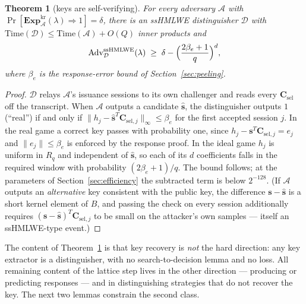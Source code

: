 \documentclass[11pt]{article}
\newcommand{\R}{R_q}
\newcommand{\Adv}{\operatorname{Adv}}
\newcommand{\Exp}{\mathbf{Exp}}
\newtheorem{theorem}{Theorem}[section]
\begin{document}
\begin{theorem}[keys are self-verifying]
\label{thm:selfverify}
For every adversary $\mathcal A$ with
$\Pr[\Exp^{\mathrm{kr}}_{\mathcal A}(\lambda)\Rightarrow 1]=\delta$,
there is an ssHMLWE distinguisher $\mathcal D$ with
$\mathrm{Time}(\mathcal D)\le\mathrm{Time}(\mathcal A)+O(Q)$ inner products
and
\[
 \Adv^{\mathrm{ssHMLWE}}_{\mathcal D}(\lambda)
 \;\ge\;\delta-\Bigl(\frac{2\beta_e+1}{q}\Bigr)^{d},
\]
where $\beta_e$ is the response-error bound of Section~\ref{sec:peeling}.
\end{theorem}

\begin{proof}
$\mathcal D$ relays $\mathcal A$'s issuance sessions to its own
challenger and reads every $\mathbf C_{\mathrm{sel}}$ off the transcript.
When $\mathcal A$ outputs a candidate $\hat{\mathbf s}$, the distinguisher
outputs $1$ (``real'') if and only if
$\|h_j-\hat{\mathbf s}^{T}\mathbf C_{\mathrm{sel},j}\|_\infty\leq\beta_e$
for the first accepted session $j$.  In the real game a correct key passes
with probability one, since
$h_j-\mathbf s^{T}\mathbf C_{\mathrm{sel},j}=e_j$ and
$\|e_j\|\leq\beta_e$ is enforced by the response proof.  In the ideal game
$h_j$ is uniform in $\R$ and independent of $\hat{\mathbf s}$, so each of
its $d$ coefficients falls in the required window with probability
$(2\beta_e+1)/q$.  The bound follows; at the parameters of
Section~\ref{sec:efficiency} the subtracted term is below $2^{-128}$.
(If $\mathcal A$ outputs an \emph{alternative} key consistent with the
public key, the difference $\mathbf s-\hat{\mathbf s}$ is a short kernel
element of $B$, and passing the check on every session additionally requires
$(\mathbf s-\hat{\mathbf s})^{T}\mathbf C_{\mathrm{sel},j}$ to be small on
the attacker's own samples --- itself an ssHMLWE-type event.)
\end{proof}

The content of Theorem~\ref{thm:selfverify} is that key recovery is
\emph{not} the hard direction: any key extractor is a distinguisher, with
no search-to-decision lemma and no loss.  All remaining content of the
lattice step lives in the other direction --- producing or predicting
responses --- and in distinguishing strategies that do not recover the key.
The next two lemmas constrain the second class.
\end{document}

